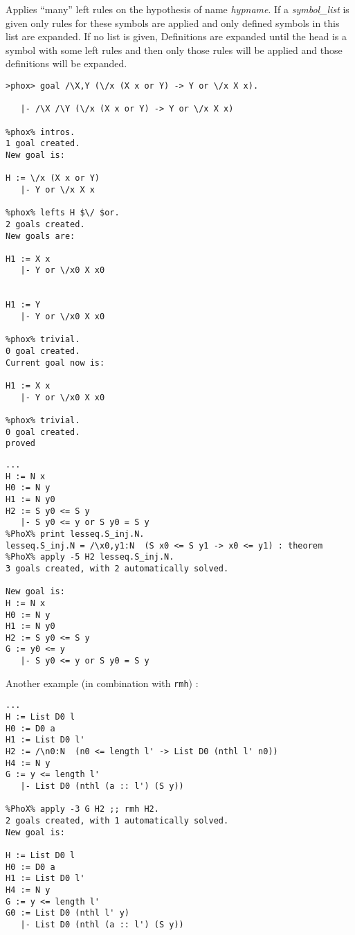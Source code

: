 \begin{description}
  Applies ``many'' left rules on the hypothesis of name {\em
  hypname}. If a {\em symbol\_list} is given only rules for these symbols are
  applied and only defined symbols in this list are expanded. If no list is
  given, Definitions are expanded until the head is a symbol with some left
  rules and then only those rules will be applied and those definitions will be
  expanded.

\begin{verbatim}
>phox> goal /\X,Y (\/x (X x or Y) -> Y or \/x X x).

   |- /\X /\Y (\/x (X x or Y) -> Y or \/x X x)

%phox% intros.
1 goal created.
New goal is:

H := \/x (X x or Y)
   |- Y or \/x X x

%phox% lefts H $\/ $or.                              
2 goals created.
New goals are:

H1 := X x
   |- Y or \/x0 X x0


H1 := Y
   |- Y or \/x0 X x0

%phox% trivial.
0 goal created.
Current goal now is:

H1 := X x
   |- Y or \/x0 X x0

%phox% trivial.
0 goal created.
proved
\end{verbatim}

\begin{verbatim}
...
H := N x
H0 := N y
H1 := N y0
H2 := S y0 <= S y
   |- S y0 <= y or S y0 = S y
%PhoX% print lesseq.S_inj.N. 
lesseq.S_inj.N = /\x0,y1:N  (S x0 <= S y1 -> x0 <= y1) : theorem
%PhoX% apply -5 H2 lesseq.S_inj.N.
3 goals created, with 2 automatically solved.

New goal is:
H := N x
H0 := N y
H1 := N y0
H2 := S y0 <= S y
G := y0 <= y
   |- S y0 <= y or S y0 = S y
\end{verbatim}
 
Another example (in combination with {\tt rmh}) :

\begin{verbatim}
...
H := List D0 l
H0 := D0 a
H1 := List D0 l'
H2 := /\n0:N  (n0 <= length l' -> List D0 (nthl l' n0))
H4 := N y
G := y <= length l'
   |- List D0 (nthl (a :: l') (S y))

%PhoX% apply -3 G H2 ;; rmh H2.
2 goals created, with 1 automatically solved.
New goal is:

H := List D0 l
H0 := D0 a
H1 := List D0 l'
H4 := N y
G := y <= length l'
G0 := List D0 (nthl l' y)
   |- List D0 (nthl (a :: l') (S y))
\end{verbatim}


\end{description}

